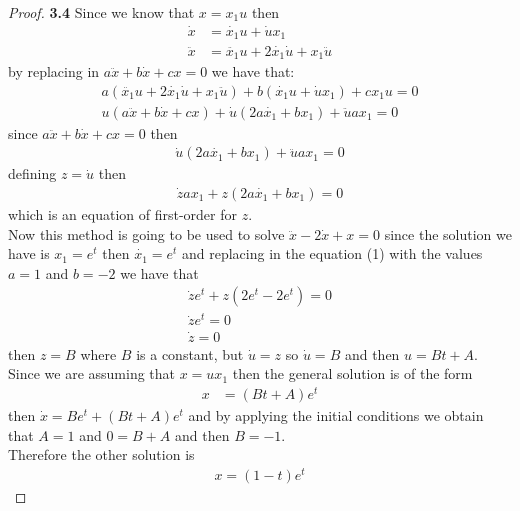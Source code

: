 \documentclass[11pt]{article}
\begin{document}
	\begin{proof}{\textbf{3.4}}
		Since we know that $x = x_1u$ then
		\begin{align*}
			\dot{x} &= \dot{x_1}u + \dot{u}x_1 \\
			\ddot{x} &= \ddot{x_1}u + 2\dot{x_1}\dot{u} + x_1\ddot{u}
		\end{align*}
		by replacing in $a\ddot{x} + b\dot{x} + cx = 0$ we have that:
		\begin{align*}
			a(\ddot{x_1}u + 2\dot{x_1}\dot{u} + x_1\ddot{u}) + b(\dot{x_1}u + \dot{u}x_1) + cx_1u = 0\\
			u(a\ddot{x} + b\dot{x} + cx) + \dot{u}(2a\dot{x_1} + bx_1) + \ddot{u}ax_1 = 0
		\end{align*}
		since $a\ddot{x} + b\dot{x} + cx = 0$ then
		\begin{align*}
			\dot{u}(2a\dot{x_1} + bx_1) + \ddot{u}ax_1 = 0
		\end{align*}
		defining $z=\dot{u}$ then
		\begin{align}
			\dot{z}ax_1 + z(2a\dot{x_1} + bx_1) = 0
		\end{align}
		which is an equation of first-order for $z$.\\
		Now this method is going to be used to solve $\ddot{x}-2\dot{x}+x=0$ 
		since the solution we have is $x_1=e^{t}$ then $\dot{x_1}=e^{t}$ and
		replacing in the equation (1) with the values $a=1$ and $b=-2$
		we have that
		\begin{align*}
			\dot{z}e^{t} + z(2e^{t} -2e^{t}) = 0\\
			\dot{z}e^{t} = 0\\
			\dot{z} = 0
		\end{align*}
		then $z=B$ where $B$ is a constant, but $\dot{u}=z$ so $\dot{u}=B$ and 
		then $u = Bt + A$. Since we are assuming that $x=ux_1$ then the general
		solution is of the form
		\begin{align*}
			x &= (Bt+A)e^{t}
		\end{align*}
		then $\dot{x} = Be^{t} + (Bt+A)e^{t}$ and by applying the initial
		conditions we obtain that $A=1$ and $0 = B + A$ and then $B = -1$.\\
		Therefore the other solution is
		\begin{align*}
			x = (1-t)e^{t}
		\end{align*}
	\end{proof}
\end{document}
